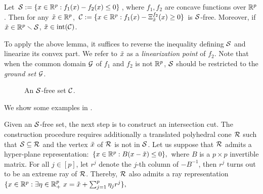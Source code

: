 \begin{lemma}\label{cor.dc2} 
Let $\mathcal S := \{x \in \mathbb R^p: f_1(x) - f_2(x) \le 0\}$, where  $f_1, f_2$ are concave functions over $\mathbb R^p$. Then  for any $\tilde{x} \in \mathbb R^p$, $\mathcal C := \{x \in \mathbb R^p: f_1(x) - {\Xi^{f_2}_{\tilde{x}}}(x) \ge 0\}$ is $\mathcal S$-free. Moreover, if $\tilde{x} \in \mathbb R^p \smallsetminus \mathcal S$, $\tilde{x} \in \operatorname{int}(\mathcal C)$.
\end{lemma}

To apply the above lemma, it suffices to reverse the inequality defining  $\mathcal S$ and linearize its convex part. We refer to $\tilde{x}$ as a \emph{linearization point} of $f_2$. Note that when the common domain  $\mathcal G$ of $f_1$ and $f_2$ is not $\mathbb R^p$,  $\mathcal S$ should be restricted to the \emph{ground set} $\mathcal G$.


\begin{figure}
 \centering
  \hfill
  \caption{An $\mathcal S$-free set $\mathcal C$.}
  \label{fig.sdef2}
\end{figure}
We show some examples in .

Given an $\mathcal S$-free set, the next step is to construct an intersection cut. The construction procedure requires additionally a translated polyhedral cone $\mathcal R$  such that $\mathcal S \subseteq \mathcal R$ and the vertex $\tilde{x}$  of $\mathcal R$ is not in $\mathcal S$. Let us suppose that $\mathcal R$ admits a hyper-plane representation: $
     \{x \in \mathbb R^p: B(x - \tilde{x}) \le 0\}, $
where $B$ is a $p \times p$ invertible matrix. For all $j\in[p]$, let $r^j$ denote the $j$-th column of $-B^{-1}$, then $r^j$ turns out to be an extreme ray of $\mathcal R$. Thereby, $\mathcal R$ also admits a ray representation $
   \{x \in \mathbb R^p:\exists \eta \in \mathbb R^p_+ \textup{ }  x =\tilde{x} +  \sum_{j =1}^{p} \eta_jr^j \}, $

